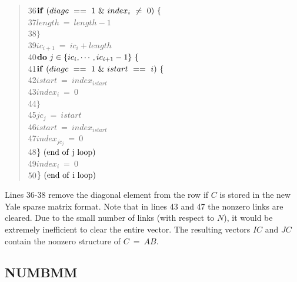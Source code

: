 \begin{quote}
36\hspace*{ 8em}$     {\bf if}\ (diagc\ ==\ 1\ \&\ index_{i}\ \neq\ 0)\ \{ $ \\
37\hspace*{12em}$         length\ =\ length - 1 $ \\
38\hspace*{12em}$         \} $ \\
39\hspace*{ 8em}$     ic_{i+1}\ =\ ic_{i} + length $ \\
40\hspace*{ 8em}$     {\bf do}\ j\in\{ic_{i},\cdots,ic_{i+1}-1\}\ \{ $ \\
41\hspace*{12em}$         {\bf if}\ (diagc\ ==\ 1\ \&\ istart\ ==\ i)\ \{ $ \\
42\hspace*{16em}$             istart\ =\ index_{istart} $ \\
43\hspace*{16em}$             index_{i}\ =\ 0 $ \\
44\hspace*{16em}$             \} $ \\
45\hspace*{12em}$         jc_{j}\ =\ istart $ \\
46\hspace*{12em}$         istart\ =\ index_{istart} $ \\
47\hspace*{12em}$         index_{jc_{j}}\ =\ 0 $ \\
48\hspace*{12em}$         \}\ (\rm end\ of\ j\ loop)  $ \\
49\hspace*{ 8em}$     index_{i}\ =\ 0 $ \\
50\hspace*{ 8em}$     \}\ (\rm end\ of\ i\ loop) $
\end{quote}
Lines 36-38 remove the diagonal element from the row if $C$ is stored in the
new Yale sparse matrix format.  Note that in lines 43 and 47 the nonzero links
are cleared.  Due to the small number of links (with respect to $N$), it would
be extremely inefficient to clear the entire vector.  The resulting vectors
$IC$ and $JC$ contain the nonzero structure of \mbox{$C\ =\ AB$}.
 
\subsection{NUMBMM}
 
